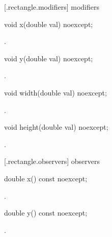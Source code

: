  [\iotwod.rectangle.modifiers]{ modifiers}

%
%
\begin{itemdecl}
void x(double val) noexcept;
\end{itemdecl}

\begin{itemdescr}
	\pnum
	\postconditions
	.
\end{itemdescr}

%
%
\begin{itemdecl}
    void y(double val) noexcept;
\end{itemdecl}
\begin{itemdescr}
	\pnum
	\postconditions
	.
\end{itemdescr}

%
%
\begin{itemdecl}
	void width(double val) noexcept;
\end{itemdecl}
\begin{itemdescr}
	\pnum
	\postconditions
	.
\end{itemdescr}

%
%
\begin{itemdecl}
	void height(double val) noexcept;
\end{itemdecl}
\begin{itemdescr}
	\pnum
	\postconditions
	.
\end{itemdescr}

 [\iotwod.rectangle.observers]{ observers}

%
%
\begin{itemdecl}
    double x() const noexcept;
\end{itemdecl}
\begin{itemdescr}
	\pnum
	\returns
	.
\end{itemdescr}

%
%
\begin{itemdecl}
    double y() const noexcept;
\end{itemdecl}
\begin{itemdescr}
	\pnum
	\returns
	.
\end{itemdescr}

